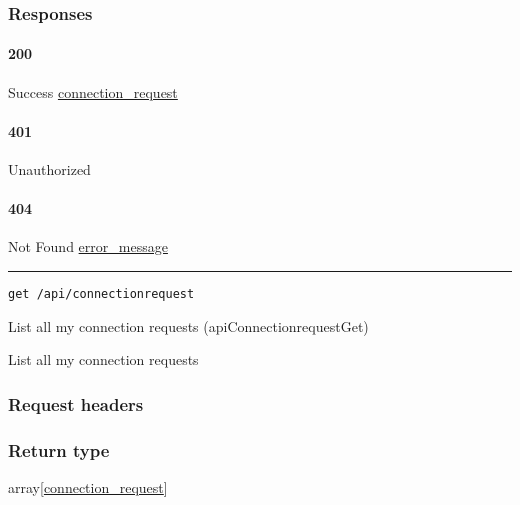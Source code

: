 \hypertarget{responses-113}{%
\subsubsection{Responses}\label{responses-113}}

\hypertarget{section-369}{%
\paragraph{200}\label{section-369}}

Success \protect\hyperlink{connection_request}{connection\_request}

\hypertarget{section-370}{%
\paragraph{401}\label{section-370}}

Unauthorized \protect\hyperlink{}{}

\hypertarget{section-371}{%
\paragraph{404}\label{section-371}}

Not Found \protect\hyperlink{error_message}{error\_message}

\begin{center}\rule{0.5\linewidth}{\linethickness}\end{center}

\protect\hypertarget{apiConnectionrequestGet}{}{}

\begin{verbatim}
get /api/connectionrequest
\end{verbatim}

List all my connection requests ({apiConnectionrequestGet})

List all my connection requests

\hypertarget{request-headers-64}{%
\subsubsection{Request headers}\label{request-headers-64}}

\hypertarget{return-type-86}{%
\subsubsection{Return type}\label{return-type-86}}

array{[}\protect\hyperlink{connection_request}{connection\_request}{]}

